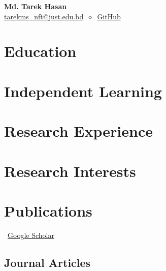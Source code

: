 \documentclass[11pt]{article} %
\makeatletter
\newcommand{\mytitle}[4]{
  \begin{center}
    \Huge\textbf{Md. Tarek Hasan}\normalsize \\ %
    \href{mailto:tarekms_nft@just.edu.bd}{tarekms\_nft@just.edu.bd}
    $\ \diamond\ $
  \href{https://github.com/tareknowshin}{GitHub}
  \end{center}
}
\makeatother
\begin{document}
\mytitle{Your Name}{person@gmail.com}{yourwebsite.com}{Your Address\\Goes here\\This field can be excluded} %


\RaggedRight

\section*{Education}


\section*{Independent Learning}
\label{independent_study}



\section*{Research Experience}
\label{exp_research}


\section*{Research Interests}
\label{research_interest}


\section*{Publications}
\label{pubs}

\vspace{-.75em}
\small
\faGoogle~\href{https://scholar.google.com/citations?user=6kRtk-IAAAAJ&hl=en}{Google Scholar}\\
\normalsize

\subsection*{Journal Articles}
\label{journal-article}
\newrefcontext[labelprefix=J] %
\nocite{*} %
\printbibliography[
    type=article, %
    heading=none, %
    resetnumbers=true, %
    keyword=J %
]
\end{document}
